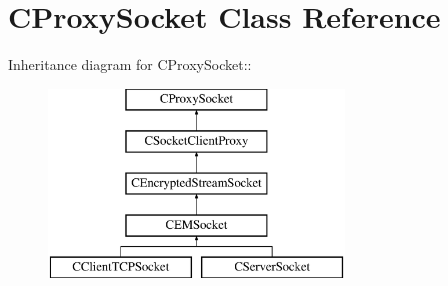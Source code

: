 \section{CProxySocket Class Reference}
\label{classCProxySocket}
Inheritance diagram for CProxySocket::\begin{figure}[H]
\begin{center}
\leavevmode
\includegraphics[height=5cm]{classCProxySocket}
\end{center}
\end{figure}
